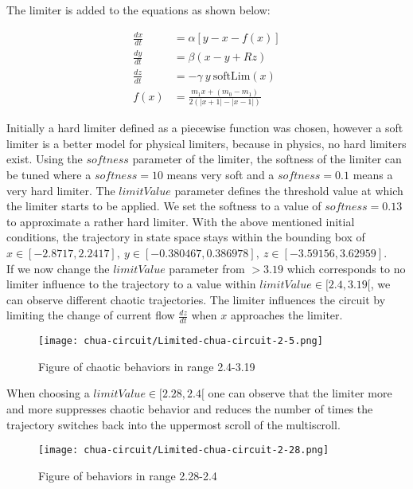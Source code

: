 \documentclass[main]{subfiles}
\begin{document}
The limiter is added to the equations as shown below:

\begin{align*}
\frac{dx}{dt}&=\alpha [y-x-f(x)] \\
\frac{dy}{dt}&=\beta (x-y+Rz)\\
\frac{dz}{dt}&=-\gamma ~ y ~ \text{softLim}(x)\\
f (x) &= \frac{m_1 x + (m_0 - m_1)}{2 (| x + 1 | -| x - 1 |)}
\end{align*}

Initially a hard limiter defined as a piecewise function was chosen, however a soft limiter is a better model for physical limiters, because in physics, no hard limiters exist. Using the $softness$ parameter of the limiter, the softness of the limiter can be tuned where a \(softness = 10\) means very soft and a \(softness = 0.1\) means a very hard limiter. The $limitValue$ parameter defines the threshold value at which the limiter starts to be applied. We set the softness to a value of \(softness=0.13\) to approximate a rather hard limiter. With the above mentioned initial conditions, the trajectory in state space stays within the bounding box of \(x \in [-2.8717,2.2417],~y \in [-0.380467,0.386978],~z \in [-3.59156,3.62959]\).\\
If we now change the $limitValue$ parameter from \(>3.19\) which corresponds to no limiter influence to the trajectory to a value within \(limitValue \in [2.4,3.19[\), we can observe different chaotic trajectories. The limiter influences the circuit by limiting the change of current flow \(\frac{dz}{dt}\) when \(x\) approaches the limiter.

\begin{figure}[H]
\centering
\texttt{[image: chua-circuit/Limited-chua-circuit-2-5.png]}
\caption[Figure of chaotic behaviors in range 2.4-3.19]{Figure of chaotic behaviors in range 2.4-3.19}
\label{figure:chaotictrajectories}
\end{figure}

When choosing a \(limitValue \in [2.28,2.4[\) one can observe that the limiter more and more suppresses chaotic behavior and reduces the number of times the trajectory switches back into the uppermost scroll of the multiscroll.

\begin{figure}[H]
\centering
\texttt{[image: chua-circuit/Limited-chua-circuit-2-28.png]}
\caption[Figure of behaviors in range 2.28-2.4]{Figure of behaviors in range 2.28-2.4}
\label{figure:chaotictrajectories}
\end{figure}
\end{document}
